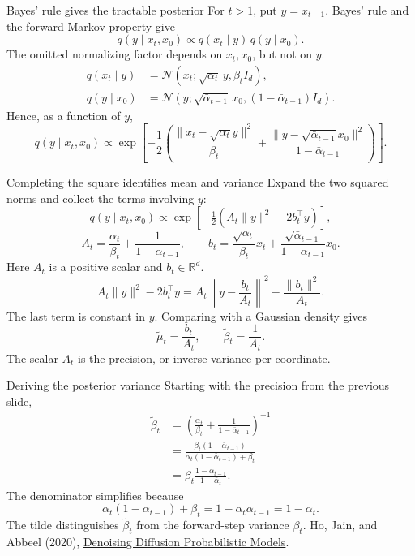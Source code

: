 \documentclass[aspectratio=169,11pt]{beamer}
\newcommand{\ddpmref}{\vfill{\tiny\color{gray}Ho, Jain, and Abbeel (2020), \href{https://arxiv.org/abs/2006.11239}{Denoising Diffusion Probabilistic Models}.}}
\begin{document}
\begin{frame}{Bayes' rule gives the tractable posterior}
For $t>1$, put $y=x_{t-1}$. Bayes' rule and the forward Markov property give
\[q(y\mid x_t,x_0)\propto q(x_t\mid y)\,q(y\mid x_0).\]
The omitted normalizing factor depends on $x_t,x_0$, but not on $y$.
\begin{align*}
q(x_t\mid y)&=\mathcal N(x_t;\sqrt{\alpha_t}\,y,\beta_t I_d),\\[2mm]
q(y\mid x_0)&=\mathcal N(y;\sqrt{\bar\alpha_{t-1}}\,x_0,
(1-\bar\alpha_{t-1})I_d).
\end{align*}
Hence, as a function of $y$,
\[q(y\mid x_t,x_0)\propto\exp\!\left[-\frac12\left(
\frac{\|x_t-\sqrt{\alpha_t}y\|^2}{\beta_t}
+\frac{\|y-\sqrt{\bar\alpha_{t-1}}x_0\|^2}{1-\bar\alpha_{t-1}}
\right)\right].\]
\end{frame}

\begin{frame}{Completing the square identifies mean and variance}
Expand the two squared norms and collect the terms involving $y$:
\[q(y\mid x_t,x_0)\propto\exp[-\tfrac12(A_t\|y\|^2-2b_t^\top y)],\]
\[A_t=\frac{\alpha_t}{\beta_t}+\frac{1}{1-\bar\alpha_{t-1}},
\qquad b_t=\frac{\sqrt{\alpha_t}}{\beta_t}x_t+
\frac{\sqrt{\bar\alpha_{t-1}}}{1-\bar\alpha_{t-1}}x_0.\]
Here $A_t$ is a positive scalar and $b_t\in\mathbb R^d$.
\[A_t\|y\|^2-2b_t^\top y
=A_t\left\|y-\frac{b_t}{A_t}\right\|^2-\frac{\|b_t\|^2}{A_t}.\]
The last term is constant in $y$. Comparing with a Gaussian density gives
\[\boxed{\tilde\mu_t=\frac{b_t}{A_t},\qquad
\tilde\beta_t=\frac1{A_t}.}\]
The scalar $A_t$ is the precision, or inverse variance per coordinate.
\end{frame}

\begin{frame}{Deriving the posterior variance}
Starting with the precision from the previous slide,
\begin{align*}
\tilde\beta_t
&=\left(\frac{\alpha_t}{\beta_t}+\frac1{1-\bar\alpha_{t-1}}\right)^{-1}\\[2mm]
&=\frac{\beta_t(1-\bar\alpha_{t-1})}
{\alpha_t(1-\bar\alpha_{t-1})+\beta_t}\\[2mm]
&=\boxed{\beta_t\frac{1-\bar\alpha_{t-1}}{1-\bar\alpha_t}}.
\end{align*}
The denominator simplifies because
\[\alpha_t(1-\bar\alpha_{t-1})+\beta_t
=1-\alpha_t\bar\alpha_{t-1}=1-\bar\alpha_t.\]
The tilde distinguishes $\tilde\beta_t$ from the forward-step variance $\beta_t$.
\ddpmref
\end{frame}
\end{document}
